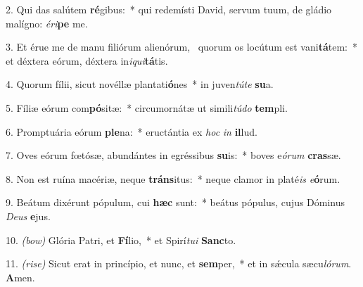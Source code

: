 2. Qui das salútem \textbf{ré}gibus:~* qui redemísti David, servum tuum, de gládio malígno: \textit{é}\textit{ri}\textbf{pe} me.

3. Et érue me de manu filiórum alienórum,~{\color{red}\GreDagger} quorum os locútum est vani\textbf{tá}tem:~* et déxtera eórum, déxtera in\textit{i}\textit{qui}\textbf{tá}tis.

4. Quorum fílii, sicut novéllæ plantati\textbf{ó}nes~* in juven\textit{tú}\textit{te} \textbf{su}a.

5. Fíliæ eórum com\textbf{pó}sitæ:~* circumornátæ ut simili\textit{tú}\textit{do} \textbf{tem}pli.

6. Promptuária eórum \textbf{ple}na:~* eructántia ex \textit{hoc} \textit{in} \textbf{il}lud.

7. Oves eórum fœtósæ, abundántes in egréssibus \textbf{su}is:~* boves e\textit{ó}\textit{rum} \textbf{cras}sæ.

8. Non est ruína macériæ, neque \textbf{tráns}itus:~* neque clamor in platé\textit{is} \textit{e}\textbf{ó}rum.

9. Beátum dixérunt pópulum, cui \textbf{hæc} sunt:~* beátus pópulus, cujus Dóminus \textit{De}\textit{us} \textbf{e}jus.

10. {\color{red}\textit{(bow)}} Glória Patri, et \textbf{Fí}lio,~* et Spirí\textit{tu}\textit{i} \textbf{Sanc}to.

11. {\color{red}\textit{(rise)}} Sicut erat in princípio, et nunc, et \textbf{sem}per,~* et in s\'{\ae}cula sæcu\textit{ló}\textit{rum}. \textbf{A}men.


